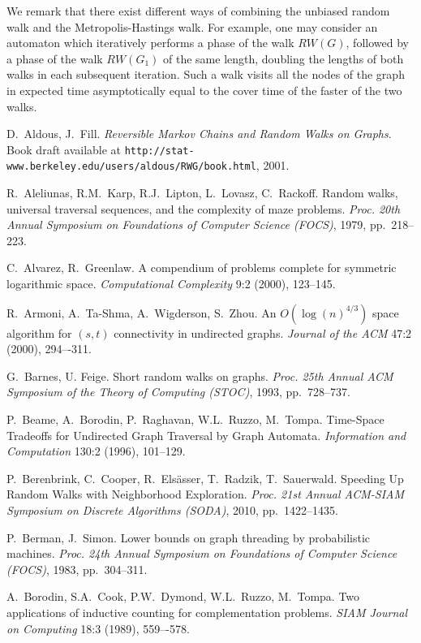 \documentclass[11pt,a4paper]{article}
\renewcommand{\*}{\hspace*{5mm}}
\begin{document}
We remark that there exist different ways of combining the unbiased random walk and the Metropolis-Hastings walk. For example, one may consider an automaton which iteratively performs a phase of the walk $RW(G)$, followed by a phase of the walk $RW(G_1)$ of the same length, doubling the lengths of both walks in each subsequent iteration. Such a walk visits all the nodes of the graph in expected time asymptotically equal to the cover time of the faster of the two walks.

\newpage
{}
\setcounter{page}{1}
\begin{thebibliography}{19}

D.~Aldous, J.~Fill.
\emph{Reversible Markov Chains and Random Walks on Graphs}.
Book draft available at \texttt{http://stat-www.berkeley.edu/users/aldous/RWG/book.html}, 2001.

R.~Aleliunas, R.M.~Karp, R.J.~Lipton, L.~Lovasz, C.~Rackoff.
Random walks, universal traversal sequences, and the complexity of maze problems.
\emph{Proc. 20th Annual Symposium on Foundations of Computer Science (FOCS)}, 1979, pp.~218--223.

C.~Alvarez, R.~Greenlaw.
A compendium of problems complete for symmetric logarithmic space.
\emph{Computational Complexity }9:2 (2000), 123--145.

R.~Armoni, A.~Ta-Shma, A.~Wigderson, S.~Zhou.
An $O(\log(n)^{4/3})$ space algorithm for $(s,t)$ connectivity in undirected graphs.
\emph{Journal of the ACM }47:2 (2000), 294–-311.

G.~Barnes, U. Feige.
Short random walks on graphs.
\emph{Proc. 25th Annual ACM Symposium of the Theory of Computing (STOC)}, 1993, pp.~728--737.

P.~Beame, A.~Borodin, P.~Raghavan, W.L.~Ruzzo, M.~Tompa.
Time-Space Tradeoffs for Undirected Graph Traversal by Graph Automata.
\emph{Information and Computation }130:2 (1996), 101--129.

P.~Berenbrink, C.~Cooper, R.~Els\"{a}sser, T.~Radzik, T.~Sauerwald.
Speeding Up Random Walks with Neighborhood Exploration.
\emph{Proc. 21st Annual ACM-SIAM Symposium on Discrete Algorithms (SODA)}, 2010, pp.~1422--1435.

P.~Berman, J.~Simon.
Lower bounds on graph threading by probabilistic machines.
\emph{Proc. 24th Annual Symposium on Foundations of Computer Science (FOCS)}, 1983, pp.~304--311.

A.~Borodin, S.A.~Cook, P.W.~Dymond, W.L.~Ruzzo, M.~Tompa.
Two applications of inductive counting for complementation problems.
\emph{SIAM Journal on Computing }18:3 (1989), 559–-578.


\end{thebibliography}
\end{document}
